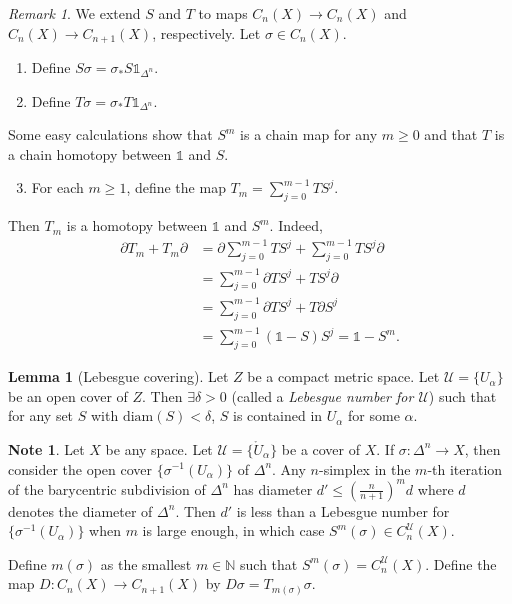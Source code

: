 \documentclass[10pt,letterpaper,cm]{nupset}
\theoremstyle{definition}
\newtheorem{note}[definition]{Note}
\theoremstyle{theorem}
\newtheorem{lemma}[definition]{Lemma}
\theoremstyle{remark}
\newtheorem{remark}[definition]{Remark}
\newcommand{\N}{\mathbb N}
\newcommand{\U}{\mathcal U}
\newcommand{\1}{\mathbb{1}}
\newcommand{\0}{\vec 0}
\begin{document}
\begin{remark} We extend $S$ and $T$ to maps $C_n(X) \to C_n(X)$ and $C_n(X) \to C_{n+1}(X)$, respectively. Let $\sigma \in C_n(X)$.
\begin{enumerate}[label=(\alph*)]
\item Define $S{\sigma} =\sigma_{\ast}{S{\1_{\Delta^n}}}$.
\item  Define $T{\sigma} = \sigma_{\ast}{T{\1_{\Delta^n}}}.$
\end{enumerate}
Some easy calculations show that $S^m$ is a chain map for any $m\geq 0$ and that $T$ is a chain homotopy between $\1$ and $S$.
\begin{enumerate}[label=(\alph*)]
\setcounter{enumi}{2}
\item For each $m\geq 1$, define the map $T_m = \sum_{j=0}^{m-1} TS^j $.
\end{enumerate}
Then $T_m$ is a homotopy between $\1$ and $S^m$. Indeed,
\begin{align*}
 \partial{T_m} +T_m{\partial} & = \partial{ \sum_{j=0}^{m-1} TS^j} + \sum_{j=0}^{m-1} TS^j{\partial} 
 \\ & = \sum_{j=0}^{m-1} \partial{TS^j} +TS^j{\partial}
 \\ & =  \sum_{j=0}^{m-1} \partial{TS^j} +T\partial{S^j}
 \\ & = \sum_{j=0}^{m-1}(\1 -S)S^j = \1 - S^m.
\end{align*}
\end{remark}

\begin{lemma}[Lebesgue covering]
Let $Z$ be a compact metric space. Let $\U =\{U_{\alpha}\}$ be an open cover of $Z$. Then $\exists \delta >0$ (called a \textit{Lebesgue number for $\U$}) such that for any set $S$ with $\text{diam}(S) < \delta$, $S$ is contained in $U_{\alpha}$ for some $\alpha$.
\end{lemma}

\begin{note}
Let $X$ be any space.  Let $\U =\{\mathring{U}_{\alpha}\}$ be a cover of $X$. If $\sigma : \Delta^n \to X$, then consider the open cover $\{ \sigma^{-1}(U_{\alpha})\} $ of $\Delta^n$. Any $n$-simplex in the $m$-th iteration of the barycentric subdivision of $\Delta^n$ has diameter $d'\leq (\frac{n}{n+1})^md$ where $d$ denotes the diameter of $\Delta^n$. Then $d'$ is less than a Lebesgue number for $\{ \sigma^{-1}(U_{\alpha})\}$ when $m$ is large enough, in which case $S^m(\sigma) \in C_n^{\U}(X)$.

Define $m(\sigma)$ as the smallest $m\in \N$ such that $S^m(\sigma) =C_n^{\U}(X)$. Define the map $D: C_n(X) \to  C_{n+1}(X)$ by $D{\sigma} =T_{m(\sigma)}{\sigma}$.
\end{note}
\end{document}
